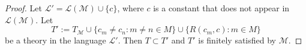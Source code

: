 \documentclass{article}
\begin{document}
\begin{enumerate}[label={\bf Q\arabic*:}]
\begin{enumerate}
        \begin{proof}
          Let $\mathcal{L}'=\mathcal{L}(\mathcal{M})\cup\{c\}$, where $c$
          is a constant that does not appear in $\mathcal{L}(\mathcal{M})$.
          Let \[T':=T_\mathcal{M}\cup \{c_m\neq c_n:m\neq n\in M\}
          \cup\{R(c_m,c):m\in M\}\] be a theory in the language
          $\mathcal{L}'$. Then $T\subset T'$ and $T'$ is finitely satisfied
          by $\mathcal{M}$.
        \end{proof}
    \end{enumerate}
\end{enumerate}
\end{document}
